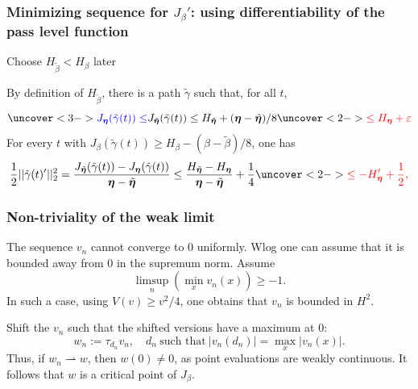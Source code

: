 \documentclass[9pt, english]{beamer}
\theoremstyle{definition}
\begin{document}
\begin{frame}
\frametitle{Minimizing sequence for $J_\beta'$: using
differentiability of the pass level function} Choose
$H_{\tilde\beta} < H_\beta$ later 

By definition of $H_{\tilde\beta}$, there is a path $\tilde\gamma$
such that, for all $t$,
\[
\uncover<3->{{\color{blue} J_\beta(\tilde\gamma(t)) \leq}}
J_{\tilde\beta} (\tilde\gamma(t)) \leq H_{\tilde\beta} + (\beta -
\tilde\beta)/8 \uncover<2->{{\color{red} \leq H_\beta + \epsilon}}
\]
For every $t$ with $J_\beta(\tilde\gamma(t)) \geq H_\beta -
(\beta-\tilde\beta)/8$, one has
\[
\frac12 ||\tilde\gamma(t)'||_2^2 =
\frac{J_{\tilde\beta}(\tilde\gamma(t)) -
J_\beta(\tilde\gamma(t))}{\beta - \tilde\beta} \leq
\frac{H_{\tilde\beta} - H_\beta}{\beta - \tilde\beta} + \frac14
\uncover<2->{{\color{red} \leq - H'_\beta + \frac12,}}
\]

\end{frame}

\begin{frame}
\frametitle{Non-triviality of the weak limit} The sequence $v_n$
cannot converge to $0$ uniformly. Wlog one can assume that it is
bounded away from $0$ in the supremum norm. Assume
\[
\limsup_n (\min_x v_n(x)) \geq -1.
\]
In such a case, using $V(v) \geq v^2/4$, one obtains that $v_n$ is
bounded in $H^2$.

Shift the $v_n$ such that the shifted versions have a maximum at
$0$:
\[
w_n := \tau_{d_n} v_n, \quad d_n \ \text{such that}\  |v_n(d_n)| =
\max_x |v_n(x)|.
\]
Thus, if $w_n \rightharpoonup w$, then $w(0) \neq 0$, as point
evaluations are weakly continuous. It follows that $w$ is a critical
point of $J_\beta$.
\end{frame}


\end{document}
